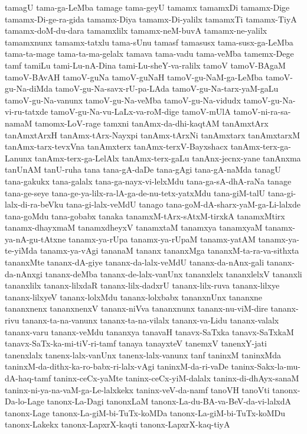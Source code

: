 {tamagU
tama-ga-LeMba
tamage
tama-geyU
tamamx
tamamxDi
tamamx-Dige
tamamx-Di-ge-ra-gida
tamamx-Diya
tamamx-Di-yalilx
tamamxTi
tamamx-TiyA
tamamx-doM-du-dara
tamamxlilx
tamamx-neM-buvA
tamamx-ne-yalilx
tamamxnunx
tamamx-tatxlu
tama-sUnu
tamasf
tamasusx
tama-susx-ga-LeMba
tama-ta-mage
tama-ta-ma-gelalx
tamava
tama-vadu
tama-veMba
tamemx-Dege
tamf
tamiLu
tami-Lu-nA-Dina
tami-Lu-sheY-va-ralilx
tamoV
tamoV-BAgaM
tamoV-BAvAH
tamoV-guNa
tamoV-guNaH
tamoV-gu-NaM-ga-LeMba
tamoV-gu-Na-diMda
tamoV-gu-Na-savx-rU-pa-LAda
tamoV-gu-Na-tarx-yaM-gaLu
tamoV-gu-Na-vanunx
tamoV-gu-Na-veMba
tamoV-gu-Na-vidudx
tamoV-gu-Na-vi-ru-tatxde
tamoV-gu-Na-vu-LaLx-va-roM-dige
tamoV-mUlA
tamoV-ni-ra-sa-namaM
tamomx-LoV-rage
tamxni
tanAmx-da-dhi-kaqtAM
tanAmxtArx
tanAmxtArxH
tanAmx-tArx-Nayxpi
tanAmx-tArxNi
tanAmxtarx
tanAmxtarxM
tanAmx-tarx-tevxVna
tanAmxterx
tanAmx-terxV-Bayxshacx
tanAmx-terx-ga-Lanunx
tanAmx-terx-ga-LelAlx
tanAmx-terx-gaLu
tanAnx-jecnx-yane
tanAnxma
tanUnAM
tanU-ruha
tana
tana-gA-daDe
tana-gAgi
tana-gA-naMda
tanagU
tana-gakukx
tana-galalx
tana-ga-nayx-vi-lelxMdu
tana-ga-sA-dhA-raNa
tanage
tana-ge-seye
tana-ge-ya-lilx-ra-lA-ga-de-nu-tetx-yatxMdu
tana-giM-talU
tana-gi-lalx-di-ra-beVku
tana-gi-lalx-veMdU
tanago
tana-goM-dA-sharx-yaM-ga-Li-lalxde
tana-goMdu
tana-gobabx
tanaka
tanamxM-tArx-sAtxM-tirxkA
tanamxMtirx
tanamx-dhayxmaM
tanamxdheyxV
tanamxtaM
tanamxya
tanamxyaM
tanamx-ya-nA-gu-tAtxne
tanamx-ya-rUpa
tanamx-ya-rUpaM
tanamx-yatAM
tanamx-ya-te-yiMda
tanamx-ya-vAgi
tananaM
tananx
tananxMga
tananxM-ta-ra-va-sithxta
tananxMte
tananx-dA-giye
tananx-da-lalx-veMdU
tananx-da-nAnx-gali
tananx-da-nAnxgi
tananx-deMba
tananx-de-lalx-vanUnx
tananxlelx
tananxlelxV
tananxli
tananxlilx
tananx-lilxdaR
tananx-lilx-dadxrU
tananx-lilx-ruva
tananx-lilxye
tananx-lilxyeV
tananx-lolxMdu
tananx-lolxbabx
tananxnUnx
tananxne
tananxnenx
tananxnenxV
tananx-niVva
tananxnunx
tananx-nu-viM-dire
tananx-rivu
tananx-ta-na-vanunx
tananx-ta-na-vilalx
tananx-va-Lidu
tananx-valalx
tananx-varu
tananx-veMdu
tananxya
tanavaH
tanavx-SaTxka
tanavx-SaTxkaM
tanavx-SaTx-ka-mi-tiV-ri-tamf
tanaya
tanayxteV
tanemxV
tanenxY-jati
tanenxlalx
tanenx-lalx-vanUnx
tanenx-lalx-vanunx
tanf
taninxM
taninxMda
taninxM-da-dithx-ka-ro-babx-ri-lalx-vAgi
taninxM-da-ri-vaDe
taninx-Sakx-la-mu-dA-haq-tamf
taninx-ceCx-yaMte
taninx-ceCx-yiM-dalalx
taninx-di-dhAyx-sanaM
taninx-ni-ya-na-vaM-ga-Le-lalxkekx
taninx-veV-da-namf
tanoVH
tanoVti
tanonx-Da-lo-Lage
tanonx-La-Dagi
tanonxLaM
tanonx-La-du-BA-va-BeV-da-vi-lalxdA
tanonx-Lage
tanonx-La-giM-bi-TuTx-koMDa
tanonx-La-giM-bi-TuTx-koMDu
tanonx-Lakekx
tanonx-LapxrX-kaqti
tanonx-LapxrX-kaq-tiyA
}

